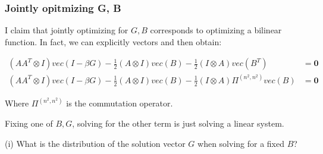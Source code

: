 \subsubsection{Jointly opitmizing G, B}

I claim that jointly optimizing for $G, B$ corresponds to optimizing a bilinear function. In fact, we can explicitly vectors and then obtain: 

\begin{align*}
(AA^T \otimes I) vec(I - \beta G) - \frac 1 2 (A \otimes I) vec(B) - \frac 1 2 (I \otimes A) vec(B^T) 
&= \bm{0} \\
(AA^T \otimes I) vec(I - \beta G) - \frac 1 2 (A \otimes I) vec(B) - \frac 1 2 (I \otimes A) \Pi^{(n^2, n^2)} vec(B) &= \bm{0}
\end{align*}

Where $\Pi^{(n^2, n^2)}$ is the commutation operator. 

Fixing one of $B, G$, solving for the other term is just solving a linear system. 

(i) What is the distribution of the solution vector $G$ when solving for a fixed $B$? 

